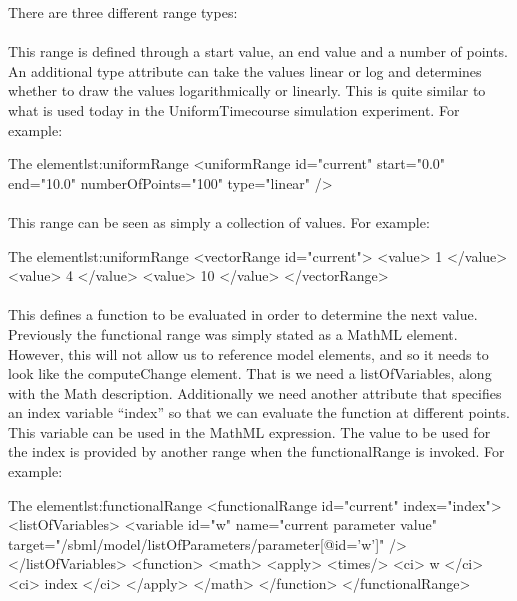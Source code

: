 There are three different range types: 

\paragraph{}
This range is defined through a start value, an end value and a number of points. An additional type attribute can take the values linear or log and determines whether to draw the values logarithmically or linearly. This is quite similar to what is used today in the UniformTimecourse simulation experiment. For example:
\begin{myXmlLst}{The  element}{lst:uniformRange}
    <uniformRange id="current" start="0.0" end="10.0" numberOfPoints="100" type="linear" /> 
\end{myXmlLst}

\paragraph{}
This range can be seen as simply a collection of values. For example:
\begin{myXmlLst}{The  element}{lst:uniformRange}
    <vectorRange id="current"> 
        <value> 1 </value> 
        <value> 4 </value> 
        <value> 10 </value> 
    </vectorRange> 
\end{myXmlLst}

\paragraph{}
This defines a function to be evaluated in order to determine the next value. Previously the functional range was simply stated as a MathML element. However, this will not allow us to reference model elements, and so it needs to look like the computeChange element. That is we need a listOfVariables, along with the Math description. Additionally we need another attribute that specifies an index variable “index” so that we can evaluate the function at different points. This variable can be used in the MathML expression. The value to be used for the index is provided by another range when the functionalRange is invoked. For example:
\begin{myXmlLst}{The  element}{lst:functionalRange}
    <functionalRange id="current" index="index"> 
      <listOfVariables> 
         <variable id="w" name="current parameter value"   
                          target="/sbml/model/listOfParameters/parameter[@id='w']" /> 
      </listOfVariables> 
      <function>
        <math> 
           <apply>
           <times/>
           <ci> w </ci> 
           <ci> index </ci> 
           </apply>
        </math>  
      </function>
    </functionalRange> 
\end{myXmlLst}

